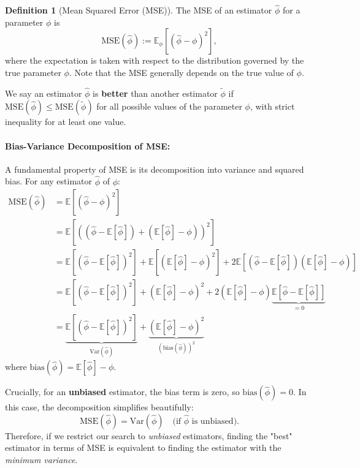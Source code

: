 \documentclass[11pt, letterpaper]{article}
\theoremstyle{plain} %
\theoremstyle{definition} %
\newtheorem{definition}[theorem]{Definition}
\theoremstyle{remark} %
\newcommand{\E}{\mathbb{E}}
\newcommand{\V}{\mathrm{Var}} %
\newcommand{\MSE}{\mathrm{MSE}}
\begin{document}
\begin{definition}[Mean Squared Error (MSE)]
The MSE of an estimator $\hat{\phi}$ for a parameter $\phi$ is
\[
\MSE(\hat{\phi}) := \E_{\phi}\left[ (\hat{\phi} - \phi)^2 \right],
\]
where the expectation is taken with respect to the distribution governed by the true parameter $\phi$. Note that the MSE generally depends on the true value of $\phi$.
\end{definition}

We say an estimator $\hat{\phi}$ is \textbf{better} than another estimator $\tilde{\phi}$ if $\MSE(\hat{\phi}) \le \MSE(\tilde{\phi})$ for all possible values of the parameter $\phi$, with strict inequality for at least one value.

\paragraph{Bias-Variance Decomposition of MSE:}
A fundamental property of MSE is its decomposition into variance and squared bias. For any estimator $\hat{\phi}$ of $\phi$:
\begin{align}
\MSE(\hat{\phi}) &= \E\left[ (\hat{\phi} - \phi)^2 \right] \nonumber \\
&= \E\left[ ((\hat{\phi} - \E[\hat{\phi}]) + (\E[\hat{\phi}] - \phi))^2 \right] \nonumber \\
&= \E\left[ (\hat{\phi} - \E[\hat{\phi}])^2 \right] + \E\left[ (\E[\hat{\phi}] - \phi)^2 \right] + 2 \E\left[ (\hat{\phi} - \E[\hat{\phi}]) (\E[\hat{\phi}] - \phi) \right] \nonumber \\
&= \E\left[ (\hat{\phi} - \E[\hat{\phi}])^2 \right] + (\E[\hat{\phi}] - \phi)^2 + 2 (\E[\hat{\phi}] - \phi) \underbrace{\E[\hat{\phi} - \E[\hat{\phi}]]}_{=0} \nonumber \\
&= \underbrace{\E\left[ (\hat{\phi} - \E[\hat{\phi}])^2 \right]}_{\V(\hat{\phi})} + \underbrace{(\E[\hat{\phi}] - \phi)^2}_{(\text{bias}(\hat{\phi}))^2} \label{eq:bias_variance_decomp}
\end{align}
where $\text{bias}(\hat{\phi}) = \E[\hat{\phi}] - \phi$.

Crucially, for an \textbf{unbiased} estimator, the bias term is zero, so $\text{bias}(\hat{\phi}) = 0$. In this case, the decomposition simplifies beautifully:
\[
\MSE(\hat{\phi}) = \V(\hat{\phi}) \quad \text{(if } \hat{\phi} \text{ is unbiased)}.
\]
Therefore, if we restrict our search to \emph{unbiased} estimators, finding the "best" estimator in terms of MSE is equivalent to finding the estimator with the \emph{minimum variance}.
\end{document}
